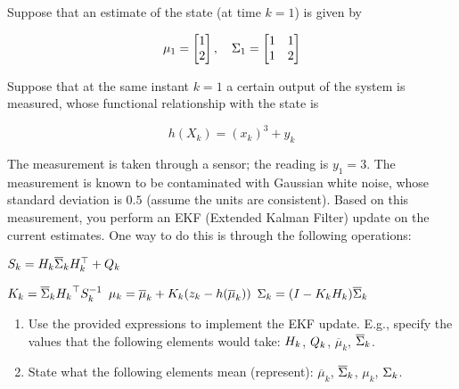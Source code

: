 \documentclass[parcial]{lcc}
\begin{document}
    Suppose that an estimate of the state (at time $k = 1$) is given by

    \begin{equation*}
    \mu_{1} = \begin{bmatrix} 1 \\ 2 \end{bmatrix}, \quad \Sigma_{1} = \begin{bmatrix} 1 & 1 \\ 1 & 2 \end{bmatrix}
    \end{equation*}

    Suppose that at the same instant $k=1$ a certain output of the system is measured, whose functional relationship with the state is

    \begin{equation*}
    h\left(X_{k}\right) = \left(x_{k}\right)^3 + y_{k}
    \end{equation*}

    The measurement is taken through a sensor; the reading is $y_{1} = 3$. The measurement is known to be contaminated with Gaussian white noise, whose standard deviation is $0.5$ (assume the units are consistent). Based on this measurement, you perform an EKF (Extended Kalman Filter) update on the current estimates. One way to do this is through the following operations: 

    \begin{algorithmic}[1] 
    \State $S_{k} = H_{k} \overline{\Sigma}_{k} H_{k}^{\top} + Q_{k} $ 

    \State $K_{k} = \overline{\Sigma}_{k} {H_{k}}^{\top} S_{k}^{-1} $ 
    \State $\mu_{k} = \overline{\mu}_{k} + K_{k}(z_{k} - h(\overline{\mu}_{k}))$ 
    \State $\Sigma_{k} = (I - K_{k}H_{k})\overline{\Sigma}_{k}$
    \end{algorithmic}

    \begin{enumerate}
    \item Use the provided expressions to implement the EKF update. E.g., specify the values that the following elements would take: $H_{k}$, $Q_{k}$, $\overline{\mu}_{k}$, $\overline{\Sigma}_{k}$.
    \item State what the following elements mean (represent): $\overline{\mu}_{k}$, $\overline{\Sigma}_{k}$, $\mu_{k}$, $\Sigma_{k}$.
    \end{enumerate}
\end{document}
